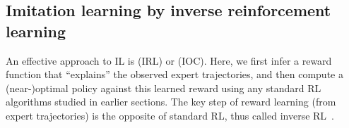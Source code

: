 
\subsection{Imitation learning by inverse reinforcement learning}
\label{sec:IRL}

An effective approach to IL is 
 (IRL)
or  (IOC).
Here, we first infer a reward function
that ``explains'' the observed expert trajectories,
and then compute a (near-)optimal policy
against this learned reward using any standard
RL algorithms studied in earlier sections.
The key step of reward learning 
(from expert trajectories)
is the opposite of standard RL,
thus called inverse RL~\citep{Ng00irl}.

